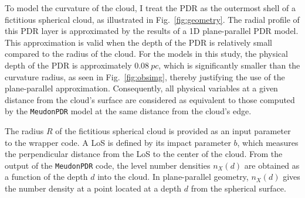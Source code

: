 \documentclass[12pt,a4paper]{article}
\newcommand{\mdpdr}{\texttt{MeudonPDR} code}
\begin{document}
To model the curvature of the cloud, I treat the PDR as the outermost shell of a fictitious spherical cloud, as illustrated in Fig.~\ref{fig:geometry}. The radial profile of this PDR layer is approximated by the results of a 1D plane-parallel PDR model. This approximation is valid when the depth of the PDR is relatively small compared to the radius of the cloud. For the models in this study, the physical depth of the PDR is approximately $\qty{0.08}{pc}$, which is significantly smaller than the curvature radius, as seen in Fig.~\ref{fig:obsimg}, thereby justifying the use of the plane-parallel approximation. Consequently, all physical variables at a given distance from the cloud's surface are considered as equivalent to those computed by the \texttt{MeudonPDR} model at the same distance from the cloud's edge.

The radius $R$ of the fictitious spherical cloud is provided as an input parameter to the wrapper code. A LoS is defined by its impact parameter $b$, which measures the perpendicular distance from the LoS to the center of the cloud. From the output of the \mdpdr{}, the level number densities $n_X(d)$ are obtained as a function of the depth $d$ into the cloud. In plane-parallel geometry, $n_X(d)$ gives the number density at a point located at a depth $d$ from the spherical surface. 
\end{document}
